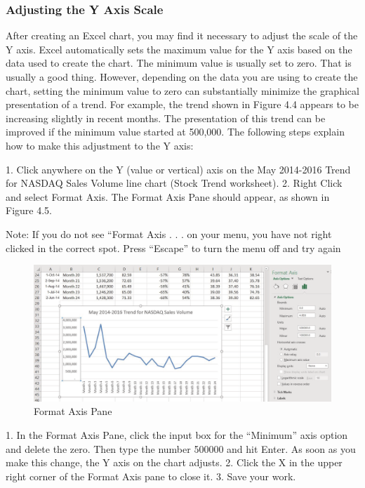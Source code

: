 \subsubsection{Adjusting the Y Axis Scale}

After creating an Excel chart, you may find it necessary to adjust the scale of the Y axis. Excel
automatically sets the maximum value for the Y axis based on the data used to create the chart. The
minimum value is usually set to zero. That is usually a good thing. However, depending on the data
you are using to create the chart, setting the minimum value to zero can substantially minimize the
graphical presentation of a trend. For example, the trend shown in Figure 4.4 appears to be increasing
slightly in recent months. The presentation of this trend can be improved if the minimum value
started at 500,000. The following steps explain how to make this adjustment to the Y axis:

1. Click anywhere on the Y (value or vertical) axis on the May 2014-2016 Trend for NASDAQ
Sales Volume line chart (Stock Trend worksheet).
2. Right Click and select Format Axis. The Format Axis Pane should appear, as shown in Figure
4.5.




Note: If you do not see “Format Axis . . . on your menu, you have not right clicked in the correct spot.
Press “Escape” to turn the menu off and try again


\begin{figure}[H]
	\centering
	\includegraphics[width=\maxwidth{.95\linewidth}]{gfx/ch04_fig05}
	\caption{Format Axis Pane}
	\label{04:fig05}
\end{figure}






1. In the Format Axis Pane, click the input box for the “Minimum” axis option and delete the zero.
Then type the number 500000 and hit Enter. As soon as you make this change, the Y axis on the
chart adjusts.
2. Click the X in the upper right corner of the Format Axis pane to close it.
3. Save your work.

